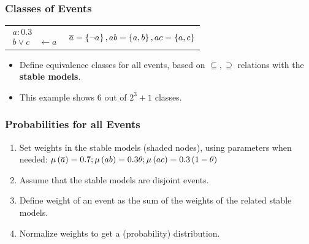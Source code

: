 \documentclass[bigger]{beamer}
\newcommand{\co}[1]{\ensuremath{\overline{#1}}}
\newcommand{\probfact}[2]{\ensuremath{#2:#1}}
\begin{document}
%
\begin{frame}
    \frametitle{Classes of Events}
    \small

    \vfill
    \begin{center}
        \diagram
    \end{center}

    \vfill
    \begin{center}
        \begin{tabular}{lr}
            $\begin{aligned}
                     \probfact{0.3}{a}       \\
                     b \vee c & \leftarrow a
                 \end{aligned}$
             &
            $\co{a} = \set{\neg a}, ab = \set{a, b}, ac = \set{a, c}$
        \end{tabular}
    \end{center}

    \vfill
    \begin{itemize}
        \item Define \alert{equivalence classes} for all events, based on $\subseteq, \supseteq$ relations with the \textbf{stable models}.
        \item This example shows $6$ out of $2^3 + 1$ classes.
    \end{itemize}
\end{frame}
%
\begin{frame}
    \frametitle{Probabilities for all Events}
    \vfill
    \begin{center}
        \diagram
    \end{center}
    \vfill
    \footnotesize
    \begin{enumerate}
        \item Set \alert{weights} in the stable models (shaded nodes), using parameters when needed: $\mu\del{\co{a}} = 0.7; \mu\del{ab} = 0.3\theta; \mu\del{ac}=0.3\del{1 - \theta}$
        \item Assume that the stable models are \alert{disjoint events}.
        \item Define \alert{weight of an event} as the sum of the weights of the related stable models.
        \item Normalize weights to get a (probability) \alert{distribution}.
    \end{enumerate}
\end{frame}
\end{document}
